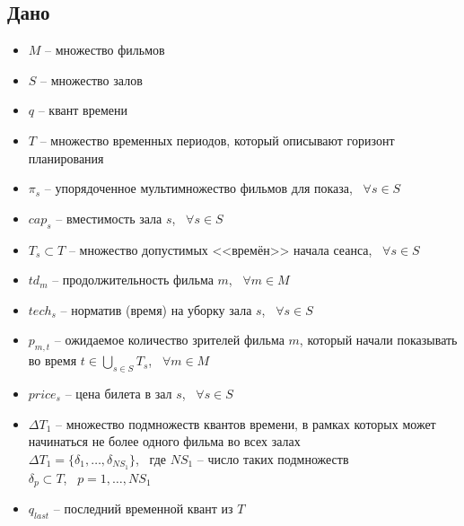 \documentclass[14pt,fleqn]{extarticle}
\begin{document}
	\subsection*{Дано}
	\renewcommand\labelitemi{$\vcenter{\hbox{\tiny$\bullet$}}$}
    \begin{itemize}[topsep=0pt,itemsep=-1ex,partopsep=1ex,parsep=1ex]
		\item $M$ -- множество фильмов
		\item $S$ -- множество залов
		\item $q$ -- квант времени
		\item $T$ -- множество временных периодов, который описывают горизонт планирования
		\item $\pi_s$ -- упорядоченное мультимножество фильмов для показа, \, $\forall s \in S$
		\item $cap_s$ -- вместимость зала $s$, \, $\forall s \in S$
		\item $T_s \subset T$ -- множество допустимых <<времён>> начала сеанса, \, $\forall s \in S$
		\item $td_m$ -- продолжительность фильма $m$, \, $\forall m \in M$
		\item $tech_s$ -- норматив (время) на уборку зала $s$, \, $\forall s \in S$
		\item $p_{m, t}$ -- ожидаемое количество зрителей фильма $m$, который начали показывать во время $t \in  \bigcup_{s \in S} T_s$, \, $\forall m \in M$
		\item $price_s$ -- цена билета в зал $s$, \, $\forall s \in S$
		\item $\Delta T_1$ -- множество подмножеств квантов времени, в рамках которых может начинаться не более одного фильма во всех залах\\
		$\Delta T_1 = \{\delta_1, \dots, \delta_{NS_1}\}$, \, где $NS_1$ -- число таких подмножеств\\
		$\delta_p \subset T$, \, $p = 1, \dots, NS_1$
		\item $q_{last}$ -- последний временной квант из $T$
	\end{itemize}
\end{document}
